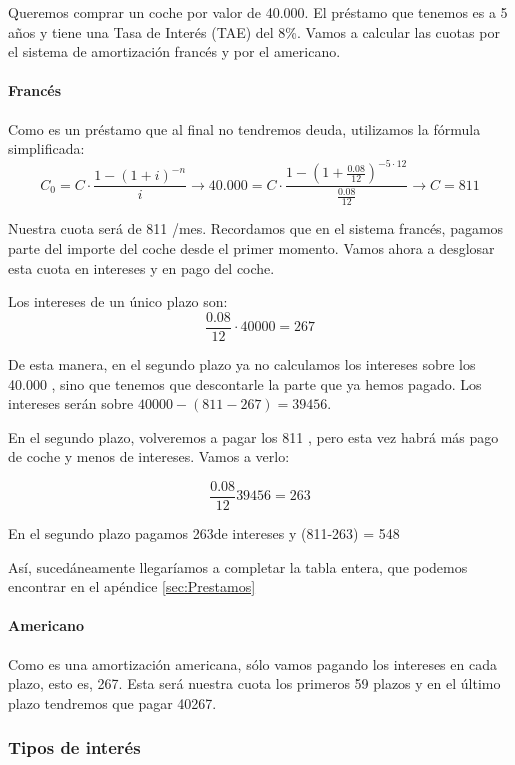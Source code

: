\documentclass[nochap,palatino,shortheader]{apuntes}
\begin{document}
\begin{example}
Queremos comprar un coche por valor de 40.000\texteuro. El préstamo que tenemos es a 5 años y tiene una Tasa de Interés (TAE) del 8\%.
Vamos a calcular las cuotas por el sistema de amortización francés y por el americano.

\paragraph{Francés}
Como es un préstamo que al final no tendremos deuda, utilizamos la fórmula simplificada:
\[C_0 = C·\frac{1-(1+i)^{-n}}{i} \to 40.000 = C·\frac{1-\left(1+\frac{0.08}{12}\right)^{-5·12}}{\frac{0.08}{12}} \to C = 811 \]

Nuestra cuota será de 811 \texteuro/mes. Recordamos que en el sistema francés, pagamos parte del importe del coche desde el primer momento. Vamos ahora a desglosar esta cuota en intereses y en pago del coche.

Los intereses de un único plazo son: \[\frac{0.08}{12}·40000 = 267\]

De esta manera, en el segundo plazo ya no calculamos los intereses sobre los 40.000 \texteuro, sino que tenemos que descontarle la parte que ya hemos pagado. Los intereses serán sobre $40000 - (811-267) = 39456$.

En el segundo plazo, volveremos a pagar los 811 \texteuro, pero esta vez habrá más pago de coche y menos de intereses. Vamos a verlo:

\[
\frac{0.08}{12}39456 = 263
\]

En el segundo plazo pagamos 263\texteuro de intereses y (811-263) = 548 \texteuro

Así, sucedáneamente llegaríamos a completar la tabla entera, que podemos encontrar en el apéndice \ref{sec:Prestamos}

\paragraph{Americano} Como es una amortización americana, sólo vamos pagando los intereses en cada plazo, esto es, 267\texteuro. Esta será nuestra cuota los primeros 59 plazos y en el último plazo tendremos que pagar 40267\texteuro.
\end{example}


\subsubsection{Tipos de interés}\label{sec:TiposInteres}
\end{document}
